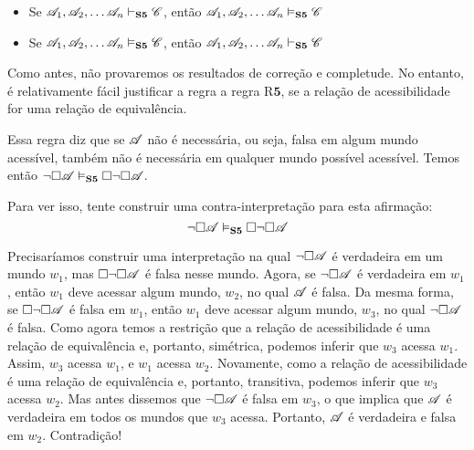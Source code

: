 \begin{itemize}
	\item Se $\mathscr{A}_1,\mathscr{A}_2, \dots \mathscr{A}_n\vdash_{\mathbf{S5}} \mathscr{C}$, então $\mathscr{A}_1,\mathscr{A}_2, \dots \mathscr{A}_n\vDash_{\mathbf{S5}} \mathscr{C}$
	\item Se $\mathscr{A}_1,\mathscr{A}_2, \dots \mathscr{A}_n\vDash_{\mathbf{S5}} \mathscr{C}$, então $\mathscr{A}_1,\mathscr{A}_2, \dots \mathscr{A}_n\vdash_{\mathbf{S5}} \mathscr{C}$
\end{itemize}
Como antes,  não  provaremos os resultados de correção e completude.  No entanto, é relativamente fácil  justificar a regra a regra R$\mathbf{5}$,  se a relação de acessibilidade for uma relação de equivalência.

Essa regra diz que se $\mathscr{A}$ não é necessária, ou seja, falsa em algum mundo acessível, também não é necessária em qualquer mundo possível acessível. Temos então $\neg\Box \mathscr{A} \vDash_{\mathbf{S5}}  \Box\neg\Box \mathscr{A}$.

Para ver isso, tente construir uma contra-interpretação para esta afirmação:
\[
	\neg\Box\mathscr{A} \vDash_{\mathbf{S5}}  \Box \neg\Box \mathscr{A}
\]
 

Precisaríamos construir uma interpretação  na qual  $\neg\Box\mathscr{A}$ é verdadeira em um mundo $w_1$, mas  $\Box \neg\Box \mathscr{A}$  é falsa nesse mundo.  Agora, se $\neg\Box\mathscr{A}$ é verdadeira em  $w_1$, então  $w_1$ deve acessar algum mundo, $w_2$, no qual $\mathscr{A}$ é falsa. Da mesma forma, se $\Box \neg\Box \mathscr{A}$ é falsa em  $w_1$, então  $w_1$ deve acessar algum mundo, $w_3$, no qual $\neg\Box \mathscr{A}$ é falsa. Como agora temos a restrição que a relação de acessibilidade é uma relação de equivalência e, portanto, simétrica, podemos inferir que $w_3$ acessa  $w_1$. Assim, $w_3$ acessa  $w_1$, e  $w_1$ acessa $w_2$. Novamente, como a relação de acessibilidade é uma relação de equivalência e, portanto, transitiva, podemos inferir que $w_3$ acessa $w_2$. Mas antes dissemos que $\neg\Box \mathscr{A}$ é falsa em $w_3$, o que implica que $\mathscr{A}$ é verdadeira em todos os mundos que $w_3$ acessa. Portanto, $\mathscr{A}$ é verdadeira e falsa em $w_2$. Contradição!

